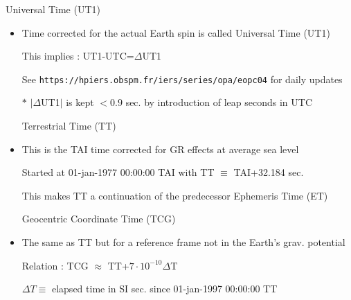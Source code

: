\Tr
\begin{center}
{\red Universal Time (UT1)}
\end{center}
%
\begin{itemize}
\item Time corrected for the actual Earth spin is called {\blue Universal Time (UT1)} 
\item[] This implies : {\blue UT1-UTC=$\Delta$UT1}
\item[] See {\tt https://hpiers.obspm.fr/iers/series/opa/eopc04} for daily updates
\item[$\ast$] $|\Delta$UT1$|$ is kept $<0.9$ sec. by introduction of leap seconds in UTC
\end{itemize}
%
\begin{itemize}
\item[] \begin{center}{\red Terrestrial Time (TT)}\end{center}
\item This is the TAI time corrected for GR effects at average sea level
\item[] Started at 01-jan-1977 00:00:00 TAI with {\blue TT $\equiv$ TAI+32.184 sec.}
\item[] This makes TT a continuation of the predecessor Ephemeris Time (ET)
\end{itemize}
%
\begin{itemize}
\item[] \begin{center}{\red Geocentric Coordinate Time (TCG)}\end{center}
\item The same as TT but for a reference frame not in the Earth's grav. potential
\item[] Relation : {\blue TCG $\approx$ TT+$7 \cdot 10^{-10} \Delta$T}
\item[] $\Delta T \equiv$ elapsed time in SI sec. since 01-jan-1997 00:00:00 TT
\end{itemize}

